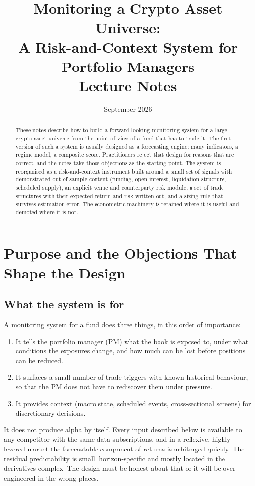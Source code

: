\documentclass[11pt,a4paper]{article}
\title{Monitoring a Crypto Asset Universe:\\ A Risk-and-Context System for Portfolio Managers\\[4pt]
\large Lecture Notes}
\author{}
\date{September 2026}
\theoremstyle{definition}
\begin{document}
\maketitle
\onehalfspacing

\begin{abstract}
\noindent These notes describe how to build a forward-looking monitoring system for a large crypto asset universe from the point of view of a fund that has to trade it. The first version of such a system is usually designed as a forecasting engine: many indicators, a regime model, a composite score. Practitioners reject that design for reasons that are correct, and the notes take those objections as the starting point. The system is reorganised as a risk-and-context instrument built around a small set of signals with demonstrated out-of-sample content (funding, open interest, liquidation structure, scheduled supply), an explicit venue and counterparty risk module, a set of trade structures with their expected return and risk written out, and a sizing rule that survives estimation error. The econometric machinery is retained where it is useful and demoted where it is not.
\end{abstract}

\tableofcontents
\newpage

\section{Purpose and the Objections That Shape the Design}

\subsection{What the system is for}

A monitoring system for a fund does three things, in this order of importance:
\begin{enumerate}[nosep]
\item It tells the portfolio manager (PM) what the book is exposed to, under what conditions the exposures change, and how much can be lost before positions can be reduced.
\item It surfaces a small number of trade triggers with known historical behaviour, so that the PM does not have to rediscover them under pressure.
\item It provides context (macro state, scheduled events, cross-sectional screens) for discretionary decisions.
\end{enumerate}
It does not produce alpha by itself. Every input described below is available to any competitor with the same data subscriptions, and in a reflexive, highly levered market the forecastable component of returns is arbitraged quickly. The residual predictability is small, horizon-specific and mostly located in the derivatives complex. The design must be honest about that or it will be over-engineered in the wrong places.
\end{document}
